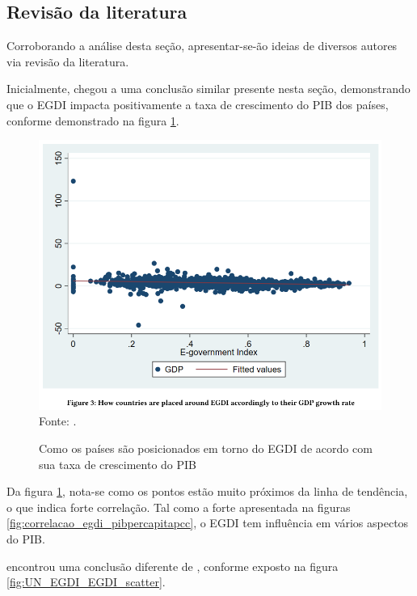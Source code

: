 \subsection{Revisão da literatura}

Corroborando a análise desta seção, apresentar-se-ão ideias de diversos autores via revisão da literatura.

Inicialmente, \cite{alisherovna2021whether} chegou a uma conclusão similar presente nesta seção, demonstrando que o EGDI impacta positivamente a taxa de crescimento do PIB dos países, conforme demonstrado na figura \ref{fig:usmanova_egdi_gdp}.

\begin{figure}[H]
	\centering
	\caption{Como os países são posicionados em torno do EGDI de acordo com sua taxa de crescimento do PIB}
	\includegraphics[width=1\linewidth]{figuras/usmanova_egdi_gdp}
	\label{fig:usmanova_egdi_gdp}
	\footnotesize{Fonte: \cite{alisherovna2021whether}.}
\end{figure}

Da figura \ref{fig:usmanova_egdi_gdp}, nota-se como os pontos estão muito próximos da linha de tendência, o que indica forte correlação. Tal como a forte apresentada na figuras \ref{fig:correlacao_egdi_pibpercapitapcc}, o EGDI tem influência em vários aspectos do PIB.

\cite{scatterplot_egdi_2024} encontrou uma conclusão diferente de \cite{alisherovna2021whether}, conforme exposto na figura \ref{fig:UN_EGDI_EGDI_scatter}.

